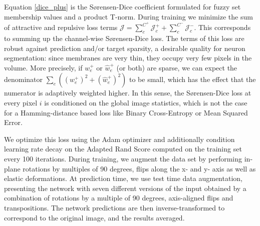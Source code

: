 Equation \ref{dice_plus} is the S{\o}rensen-Dice coefficient \cite{dice1945measures,sorensen1948method} formulated for fuzzy set membership values and a product T-norm.
During training we minimize the sum of attractive and repulsive loss terms $\mathcal{J} = \sum_{c}^{C^+} \mathcal{J}^{+}_{c} + \sum_{c}^{C^-} \mathcal{J}^{-}_{c}$. This corresponds to summing up the channel-wise S{\o}rensen-Dice loss. 
The terms of this loss are robust against prediction and/or target sparsity, a desirable quality for neuron segmentation: since membranes are very thin, they occupy very few pixels in the volume. 
More precisely, if $w^{+}_e$ or $\hat w^{+}_e$ (or both) are sparse, we can expect the denominator $\sum_e(({w^{+}_e})^2 + ({\hat {w}}^+_e)^2)$ to be small,
which has the effect that the numerator is adaptively weighted higher. 
In this sense, the S{\o}rensen-Dice loss at every pixel $i$ is conditioned on the global image statistics, which is not the case for a Hamming-distance based loss like Binary Cross-Entropy or Mean Squared Error. 

We optimize this loss using the Adam optimizer and additionally condition learning rate decay on 
the Adapted Rand Score \cite{isbi2012challenge} computed on the training set every 100 iterations.
During training, we augment the data set by performing in-plane rotations by multiples of 90 degrees, flips along the x- and y- axis as well as elastic deformations.
At prediction time, we use test time data augmentation, presenting the network with
seven different versions of the input obtained by a combination of rotations by a multiple of 90 degrees, axis-aligned flips and transpositions.
The network predictions are then inverse-transformed to correspond to the original image, and the results averaged.
